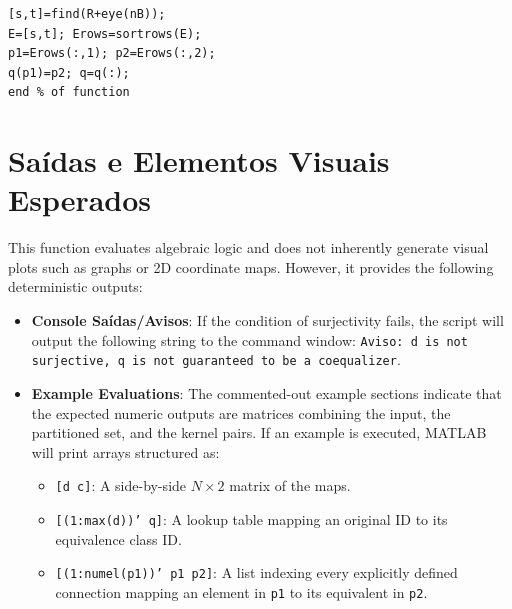 \begin{lstlisting}[caption={Output Extraction}]
[s,t]=find(R+eye(nB));
E=[s,t]; Erows=sortrows(E);
p1=Erows(:,1); p2=Erows(:,2);
q(p1)=p2; q=q(:);
end % of function
\end{lstlisting}

\section{Saídas e Elementos Visuais Esperados}

This function evaluates algebraic logic and does not inherently generate visual plots such as graphs or 2D coordinate maps. However, it provides the following deterministic outputs:

\begin{itemize}
    \item \textbf{Console Saídas/Avisos}: If the condition of surjectivity fails, the script will output the following string to the command window: \texttt{Aviso: d is not surjective, q is not guaranteed to be a coequalizer}.
    \item \textbf{Example Evaluations}: The commented-out example sections indicate that the expected numeric outputs are matrices combining the input, the partitioned set, and the kernel pairs. If an example is executed, MATLAB will print arrays structured as:
    \begin{itemize}
        \item \texttt{[d c]}: A side-by-side $N \times 2$ matrix of the maps.
        \item \texttt{[(1:max(d))' q]}: A lookup table mapping an original ID to its equivalence class ID.
        \item \texttt{[(1:numel(p1))' p1 p2]}: A list indexing every explicitly defined connection mapping an element in \texttt{p1} to its equivalent in \texttt{p2}.
    \end{itemize}
\end{itemize}
